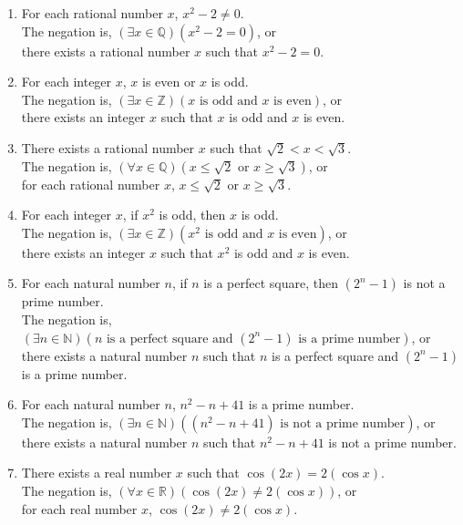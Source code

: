 \begin{enumerate}
\begin{enumerate}
\item For each rational number $x$, $x^2 - 2 \ne 0$. \\
The negation is, $\left( \exists x \in \mathbb{Q} \right) \left( x^2 - 2 = 0 \right)$, or\\ 
there exists a rational number $x$ such that $x^2 - 2 = 0$.

\item For each integer $x$, $x$ is even or $x$ is odd. \\
The negation is, $\left( \exists x \in \mathbb{Z} \right) \left( x \text{ is odd and $x$ is even} \right)$, or \\
there exists an integer $x$ such that $x$ is odd and $x$ is even.

\item There exists a rational number $x$ such that $\sqrt{2} < x < \sqrt{3}$. \\
The negation is, $\left( {\forall x \in \mathbb{Q}} \right)\left( {x \leq \sqrt 2 \text{ or } x \geq \sqrt 3 } \right)$, or \\
for each rational number $x$, $x \leq \sqrt 2$ or $x \geq \sqrt 3$.

\item For each integer $x$, if $x^2$ is odd, then $x$ is odd. \\
The negation is, $\left( \exists x \in \mathbb{Z} \right) \left( x^2 \text{ is odd and $x$ is even} \right)$, or \\
there exists an integer $x$ such that $x^2$ is odd and $x$ is even.

\item For each natural number $n$, if $n$ is a perfect square, then $\left( 2^n - 1 \right)$ is not a prime number. \\
The negation is, $\left( \exists n \in \mathbb{N} \right) \left( n \text{ is a perfect square and 
$\left( 2^n - 1 \right)$ is a prime number} \right)$, or 
there exists a natural number $n$ such that $n$ is a perfect square and $\left( 2^n - 1 \right)$ is a prime number.

\item For each natural number $n$, $n^2 - n + 41$ is a prime number. \\
The negation is, $\left( \exists n \in \mathbb{N} \right) \left( \left( n^2 - n + 41 \right) \text{ is not a prime number} \right)$, or 
there exists a natural number $n$ such that $n^2 - n + 41$ is not a prime number.

\item There exists a real number $x$ such that $\cos \left( 2x \right) = 2 \left( \cos x \right)$. \\
The negation is, $\left( {\forall x \in \mathbb{R}} \right) \left( \cos \left( 2x \right) \ne 2 \left( \cos x \right) \right)$, or \\
for each real number $x$, $\cos \left( 2x \right) \ne 2 \left( \cos x \right)$.
\end{enumerate}


\end{enumerate}
